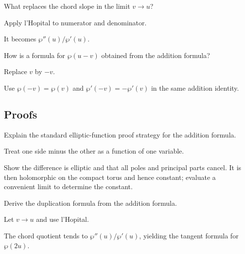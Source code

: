 \begin{exercise}\label{exr:iv30-expand-04}
What replaces the chord slope in the limit \(v\to u\)?
\end{exercise}
\begin{hint}
Apply l'Hopital to numerator and denominator.
\end{hint}
\begin{solution}
It becomes \(\wp''(u)/\wp'(u)\).
\end{solution}

\begin{exercise}[Subtraction]\label{exr:iv30-expand-05}
How is a formula for \(\wp(u-v)\) obtained from the addition formula?
\end{exercise}
\begin{hint}
Replace \(v\) by \(-v\).
\end{hint}
\begin{solution}
Use \(\wp(-v)=\wp(v)\) and \(\wp'(-v)=-\wp'(v)\) in the same addition identity.
\end{solution}

\subsection*{Proofs}

\begin{exercise}\label{exr:iv30-expand-06}
Explain the standard elliptic-function proof strategy for the addition formula.
\end{exercise}
\begin{hint}
Treat one side minus the other as a function of one variable.
\end{hint}
\begin{solution}
Show the difference is elliptic and that all poles and principal parts cancel. It is then holomorphic on the compact torus and hence constant; evaluate a convenient limit to determine the constant.
\end{solution}

\begin{exercise}\label{exr:iv30-expand-07}
Derive the duplication formula from the addition formula.
\end{exercise}
\begin{hint}
Let \(v\to u\) and use l'Hopital.
\end{hint}
\begin{solution}
The chord quotient tends to \(\wp''(u)/\wp'(u)\), yielding the tangent formula for \(\wp(2u)\).
\end{solution}

